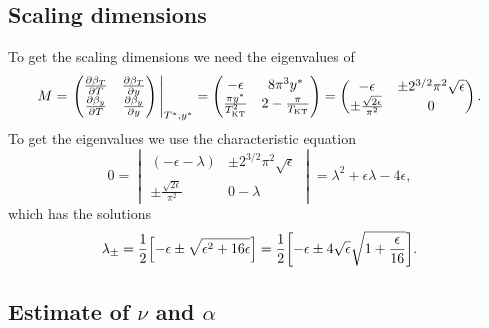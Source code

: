 \documentclass[11pt,letter, swedish, english
]{article}
\begin{document}
\subsection{Scaling dimensions}
To get the scaling dimensions we need the eigenvalues of 
\begin{equation}
M = \eval{
\begin{pmatrix}
\pdv{\beta_T}{T} & \pdv{\beta_T}{y}\\
\pdv{\beta_y}{T} & \pdv{\beta_y}{y}
\end{pmatrix}
}_{T^*, y^*}
=
\begin{pmatrix}
-\epsilon & 8\pi^3 y^*\\
\frac{\pi y^*}{\TKT^2} & 2-\frac{\pi}{\TKT}
\end{pmatrix}
=
\begin{pmatrix}
-\epsilon & \pm2^{3/2}\pi^2\sqrt{\epsilon}\\
\pm \frac{\sqrt{2\epsilon}}{\pi^2} & 0
\end{pmatrix}.
\end{equation}
To get the eigenvalues we use the characteristic equation
\begin{equation}
0=
\begin{vmatrix}
(-\epsilon -\lambda) & \pm2^{3/2}\pi^2\sqrt{\epsilon}\\
\pm \frac{\sqrt{2\epsilon}}{\pi^2} & 0-\lambda
\end{vmatrix}
= \lambda^2 + \epsilon\lambda - 4\epsilon,
\end{equation}
which has the solutions
\begin{equation}
\lambda_\pm = \frac{1}{2}\qty[ -\epsilon
\pm\sqrt{\epsilon^2 + 16\epsilon}]
= \frac{1}{2}\qty[ -\epsilon
\pm4\sqrt{\epsilon}\sqrt{1+\frac{\epsilon}{16}}].
\end{equation}







\subsection{Estimate of $\nu$ and $\alpha$}
\end{document}
